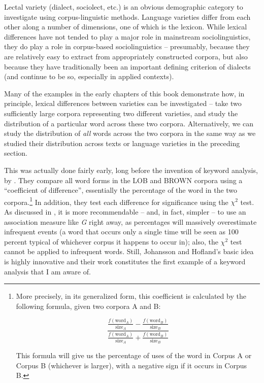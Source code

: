 Lectal variety  (dialect, sociolect, etc.) is an obvious demographic  category to investigate using corpus\hyp{}linguistic methods. Language varieties  differ from each other along a number of dimensions, one of which is the lexicon.  While lexical differences have not tended to play a major role in mainstream sociolinguistics,  they do play a role in corpus\hyp{}based sociolinguistics  -- presumably, because they are relatively easy to extract  from appropriately constructed corpora, but also because they have traditionally been an important defining criterion of dialects (and continue to be so, especially in applied contexts).

Many of the examples in the early chapters of this book demonstrate how, in principle, lexical differences between varieties  can be investigated -- take two sufficiently large  corpora representing two different varieties, and study the distribution  of a particular word across these two corpora. Alternatively, we can study the distribution of \textit{all} words across the two corpora in the same way as we studied their distribution across texts or language varieties in the preceding section.

This was actually done fairly early, long before the invention of keyword  analysis, by \citet{johansson_frequency_1989}. They compare all word forms in the LOB  and BROWN  corpora using a ``coefficient of difference'', essentially the percentage of the word in the two corpora.\footnote{More precisely, in its generalized form, this coefficient is calculated by the following formula, given two corpora A and B:

\[\frac{ \frac{f ( \text{word}_A )}{\text{size}_A} - \frac{f ( \text{word}_B )}{\text{size}_B}}{ \frac{f ( \text{word}_A )}{ \text{size}_A} + \frac{f ( \text{word}_B )}{\text{size}_B}}\]

This formula will give us the percentage of uses of the word in Corpus A or Corpus B (whichever is larger), with a negative sign if it occurs in Corpus B.} In addition, they test each difference for significance using the $\chi^2$  test. As discussed in , it is more recommendable -- and, in fact, simpler -- to use an association  measure  like \emph{G} right away, as percentages will massively overestimate infrequent events (a word that occurs only a single time will be seen as 100 percent typical of whichever corpus it happens to occur in); also, the $\chi^2$  test cannot be applied to infrequent words. Still, Johansson and Hofland's basic idea is highly innovative and their work constitutes the first example of a keyword  analysis that I am aware of.

